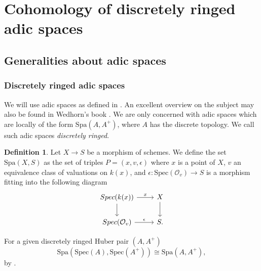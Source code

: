 \documentclass{amsart}
\def\Spa{\textrm{Spa}}
\def\Spec{\textrm{Spec}}
\theoremstyle{definition}
\newtheorem{definition}[theorem]{Definition}
\newcommand\dlog{\mathrm{dlog}}
\numberwithin{equation}{section}
\begin{document}
% 
\section{Cohomology of discretely ringed adic spaces}\label{ChapterAdic}
\subsection{Generalities about adic spaces}
\subsubsection*{Discretely ringed adic spaces}
We will use adic spaces as defined in \cite[§1.1.]{HuberEtale}. An excellent overview on the subject may also be found in Wedhorn's book \cite{WedhornAdicSpaces}. We are only concerned with adic spaces which are locally of the form $\Spa(A,A^+)$, where $A$ has the discrete topology. We call such adic spaces \textit{discretely ringed}. 
\begin{definition}
Let $X\to S$ be a morphism of schemes. We define the set $\Spa(X,S)$ as the set of triples $P=(x,v,\epsilon)$ where $x$ is a point of $X$, $v$ an equivalence class of valuations on $k(x)$, and $\epsilon:\Spec(\mathcal{O}_v)\to S$ is a morphism fitting into the following diagram
\[
\begin{tikzcd}
	\Spec(k(x))\ar[r,"x"]\ar[d]&X\ar[d]\\
	\Spec(\mathcal{O}_v)\ar[r,"\epsilon"]&S.
\end{tikzcd}
\]
\end{definition}

For a given discretely ringed Huber pair $(A,A^+)$ 
\[
\Spa(\Spec(A),\Spec(A^+))\cong \Spa(A,A^+),
\]
by \cite[Lemma 3.1.2]{TemkinRZ}.
\end{document}
